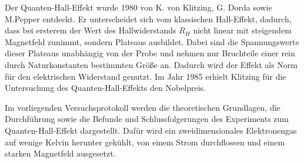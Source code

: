 

Der Quanten-Hall-Effekt wurde 1980 von K. von Klitzing, G. Dorda sowie M.Pepper entdeckt. Er unterscheidet sich vom klassischen Hall-Effekt, dadurch, dass bei ersterem der Wert des Hallwiderstands $R_H$ nicht linear mit steigendem Magnetfeld zunimmt, sondern Plateaus ausbildet. Dabei sind die Spannungswerte dieser Plateaus unabhängig von der Probe und nehmen nur Bruchteile einer rein durch Naturkonstanten bestimmten Größe an. Dadurch wird der Effekt als Norm für den elektrischen Widerstand genutzt. Im Jahr 1985 erhielt Klitzing für die Untersuchung des Quanten-Hall-Effekts den Nobelpreis.

Im vorliegenden Versuchsprotokoll werden die theoretischen Grundlagen, die Durchführung sowie die Befunde und Schlussfolgerungen des Experiments zum Quanten-Hall-Effekt dargestellt. Dafür wird ein zweidimensionales Elektronengas auf wenige Kelvin herunter gekühlt, von einem Strom durchflossen und einem starken Magnetfeld ausgesetzt.